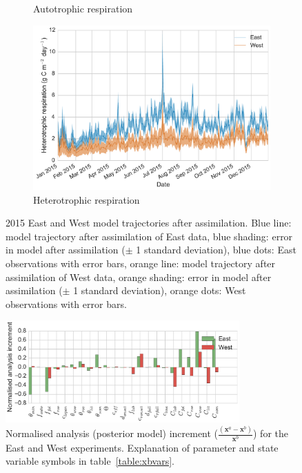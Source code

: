 \documentclass[11pt]{article}
\begin{document}
\begin{figure}[ht]
\begin{subfigure}[b]{0.49\textwidth}
        \caption{Autotrophic respiration}
        \label{fig:ra}
    \end{subfigure}
    \begin{subfigure}[b]{0.49\textwidth}
        \includegraphics[width=\textwidth]{rh.pdf}
        \caption{Heterotrophic respiration}
        \label{fig:rh}
    \end{subfigure}
    \caption{2015 East and West model trajectories after assimilation. Blue line: model trajectory after assimilation of East data, blue shading: error in model after assimilation (\(\pm\) 1 standard deviation), blue dots: East observations with error bars, orange line: model trajectory after assimilation of West data, orange shading: error in model after assimilation (\(\pm\) 1 standard deviation), orange dots: West observations with error bars.} \label{fig:nee_day}
\end{figure}

\begin{figure}[ht]
    \centering
    \includegraphics[width=0.8\textwidth]{xa_inc.pdf}
    \caption{Normalised analysis (posterior model) increment \big($\frac{(\textbf{x}^a - \textbf{x}^b)}{\textbf{x}^b}$\big) for the East and West experiments. Explanation of parameter and state variable symbols in table~\ref{table:xbvars}.}
    \label{fig:xa_inc}
\end{figure}
\end{document}

